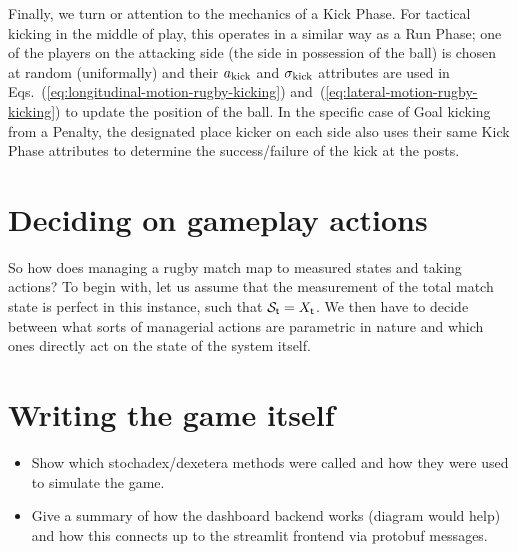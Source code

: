 Finally, we turn or attention to the mechanics of a {\sf Kick Phase}. For tactical kicking in the middle of play, this operates in a similar way as a {\sf Run Phase}; one of the players on the attacking side (the side in possession of the ball) is chosen at random (uniformally) and their $a_{\rm kick}$ and $\sigma_{\rm kick}$ attributes are used in Eqs.~(\ref{eq:longitudinal-motion-rugby-kicking}) and~(\ref{eq:lateral-motion-rugby-kicking}) to update the position of the ball. In the specific case of {\sf Goal} kicking from a {\sf Penalty}, the designated place kicker on each side also uses their same {\sf Kick Phase} attributes to determine the success/failure of the kick at the posts.

\section{\sffamily Deciding on gameplay actions}

So how does managing a rugby match map to measured states and taking actions? To begin with, let us assume that the measurement of the total match state is perfect in this instance, such that ${\cal S}_{{\sf t}}=X_{{\sf t}}$. We then have to decide between what sorts of managerial actions are parametric in nature and which ones directly act on the state of the system itself. 

\section{\sffamily Writing the game itself}

\begin{itemize}
\item{Show which stochadex/dexetera methods were called and how they were used to simulate the game.}
\item{Give a summary of how the dashboard backend works (diagram would help) and how this connects up to the streamlit frontend via protobuf messages.}
\end{itemize}